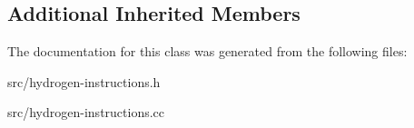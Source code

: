 \subsection*{Additional Inherited Members}


The documentation for this class was generated from the following files\+:\begin{DoxyCompactItemize}
\item 
src/hydrogen-\/instructions.\+h\item 
src/hydrogen-\/instructions.\+cc\end{DoxyCompactItemize}
